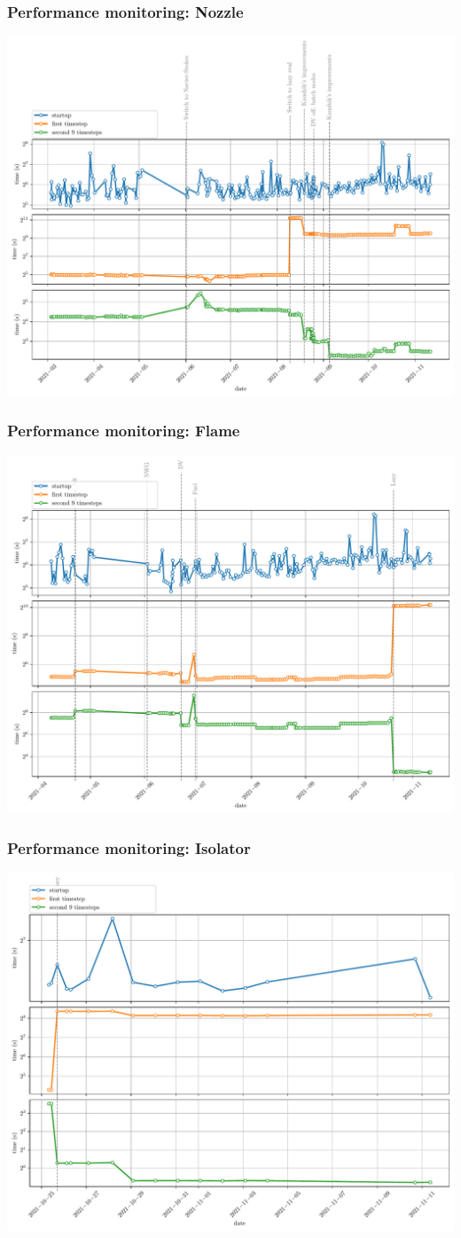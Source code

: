 \begin{frame}\frametitle{Performance monitoring: Nozzle}
\includegraphics[width=.8\textwidth]{figures/nozzle_20211112.pdf}
\end{frame}

\begin{frame}\frametitle{Performance monitoring: Flame}
\includegraphics[width=.8\textwidth]{figures/flame_20211112.pdf}
\end{frame}

\begin{frame}\frametitle{Performance monitoring: Isolator}
\includegraphics[width=.8\textwidth]{figures/isolator_20211112.pdf}
\end{frame}

